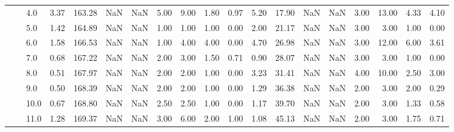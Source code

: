 \begin{tabular}{lllrrrrrrrrrrrrrrrr}
       &     & 4.0  &      3.37 &     163.28 &               NaN &                NaN &  5.00 &   9.00 &             1.80 &                         0.97 &      5.20 &      17.90 &               NaN &                NaN &  3.00 &  13.00 &             4.33 &                         4.10 \\
       &     & 5.0  &      1.42 &     164.89 &               NaN &                NaN &  1.00 &   1.00 &             1.00 &                         0.00 &      2.00 &      21.17 &               NaN &                NaN &  3.00 &   3.00 &             1.00 &                         0.00 \\
       &     & 6.0  &      1.58 &     166.53 &               NaN &                NaN &  1.00 &   4.00 &             4.00 &                         0.00 &      4.70 &      26.98 &               NaN &                NaN &  3.00 &  12.00 &             6.00 &                         3.61 \\
       &     & 7.0  &      0.68 &     167.22 &               NaN &                NaN &  2.00 &   3.00 &             1.50 &                         0.71 &      0.90 &      28.07 &               NaN &                NaN &  3.00 &   3.00 &             1.00 &                         0.00 \\
       &     & 8.0  &      0.51 &     167.97 &               NaN &                NaN &  2.00 &   2.00 &             1.00 &                         0.00 &      3.23 &      31.41 &               NaN &                NaN &  4.00 &  10.00 &             2.50 &                         3.00 \\
       &     & 9.0  &      0.50 &     168.39 &               NaN &                NaN &  2.00 &   2.00 &             1.00 &                         0.00 &      1.29 &      36.38 &               NaN &                NaN &  2.00 &   3.00 &             2.00 &                         0.29 \\
       &     & 10.0 &      0.67 &     168.80 &               NaN &                NaN &  2.50 &   2.50 &             1.00 &                         0.00 &      1.17 &      39.70 &               NaN &                NaN &  2.00 &   3.00 &             1.33 &                         0.58 \\
       &     & 11.0 &      1.28 &     169.37 &               NaN &                NaN &  3.00 &   6.00 &             2.00 &                         1.00 &      1.08 &      45.13 &               NaN &                NaN &  2.00 &   3.00 &             1.75 &                         0.71 \\

\end{tabular}
